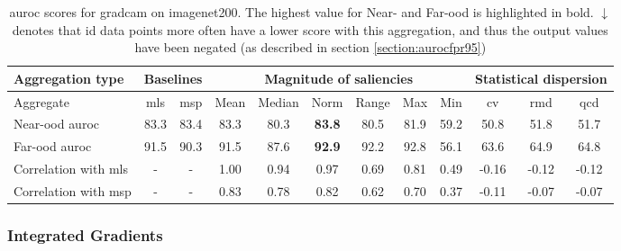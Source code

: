 \documentclass[UKenglish]{uiomasterthesis} %
\theoremstyle{definition}
\begin{document}
\begin{table}[H]
\setlength\tabcolsep{4pt}
\begin{center}
\begin{tabular}{ |m{5em}|c c|c c c c c c|c c c| }
    \hline
     Aggregation type & \multicolumn{2}{c|}{Baselines} & \multicolumn{6}{c|}{Magnitude of saliencies} & \multicolumn{3}{c|}{Statistical dispersion} \\
    \hline
     Aggregate & \ac{mls} & \ac{msp} & Mean & Median & Norm & Range & Max & Min & \ac{cv} & \ac{rmd} & \ac{qcd}  \\
    \hline
    \rowcolor{near!50}
    Near-\ac{ood} \ac{auroc} & 83.3 & 83.4 & 83.3 & 80.3 &\textbf{ 83.8 }& 80.5 & 81.9 & 59.2 & 50.8 & 51.8 & 51.7  \\
    \hline
    \rowcolor{far!50}
    Far-\ac{ood} \ac{auroc} & 91.5 & 90.3 & 91.5 & 87.6 &\textbf{ 92.9 }& 92.2 & 92.8 & 56.1 & 63.6 & 64.9 & 64.8  \\
    \hline
    Correlation with \ac{mls}& - & - & 1.00 & 0.94 & 0.97 & 0.69 & 0.81 & 0.49 & -0.16 & -0.12 & -0.12  \\
    \hline
    Correlation with \ac{msp}& - & - & 0.83 & 0.78 & 0.82 & 0.62 & 0.70 & 0.37 & -0.11 & -0.07 & -0.07  \\
    \hline
    \end{tabular}
    \caption{\ac{auroc} scores for gradcam on imagenet200. The highest value for Near- and Far-\ac{ood} is highlighted in bold. $\downarrow$ denotes that \ac{id} data points more often have a lower score with this aggregation, and thus the output values have been negated (as described in section \ref{section:aurocfpr95})}

    \label{table:imagenet200_gradcam_metrics}
\end{center}
\setlength\tabcolsep{6pt}
\end{table}

\subsubsection{Integrated Gradients}
\end{document}
